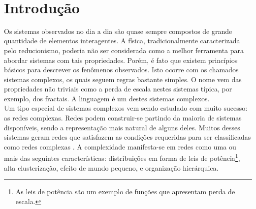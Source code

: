 \documentclass[a4paper,openright,12pt]{report} %
\begin{document}
  

%
%


\newpage\ \thispagestyle{empty}  \newpage\thispagestyle{empty}

\tableofcontents\thispagestyle{empty}\thispagestyle{empty}%

\clearpage \thispagestyle{empty}

\pagestyle{fancy}






\chapter{Introdu\c c\~ao}

Os sistemas observados no dia a dia s\~ao quase sempre compostos de grande quantidade de elementos interagentes. A física, tradicionalmente caracterizada pelo reducionismo, poderia n\~ao ser considerada como a melhor ferramenta para abordar sistemas com tais propriedades. Por\'em, \'e fato que existem princ\'ipios b\'asicos para descrever os fen\^omenos observados. Isto ocorre com os chamados sistemas complexos, os quais seguem regras bastante simples. O nome vem das propriedades n\~ao triviais como a perda de escala nestes sistemas t\'ipica, por exemplo, dos fractais. A linguagem \'e um destes sistemas complexos.\\

Um tipo especial de sistemas complexos vem sendo estudado com muito sucesso: as redes complexas. Redes podem construir-se partindo da maioria de sistemas dispon\'iveis, sendo a representa\c c\~ao mais natural de alguns deles. Muitos desses sistemas geram redes que satisfazem as condi\c c\~oes requeridas para ser classificadas como redes complexas \cite{barabasi1999emergence}. A complexidade manifesta-se em redes como uma ou mais das seguintes caracter\'isticas: distribui\c c\~oes em forma de leis de pot\^encia\footnote{As leis de pot\^encia s\~ao um exemplo de fun\c c\~oes que apresentam perda de escala.}, alta clusteriza\c c\~ao, efeito de mundo pequeno, e organiza\c c\~ao hier\'arquica.\\
\end{document}
